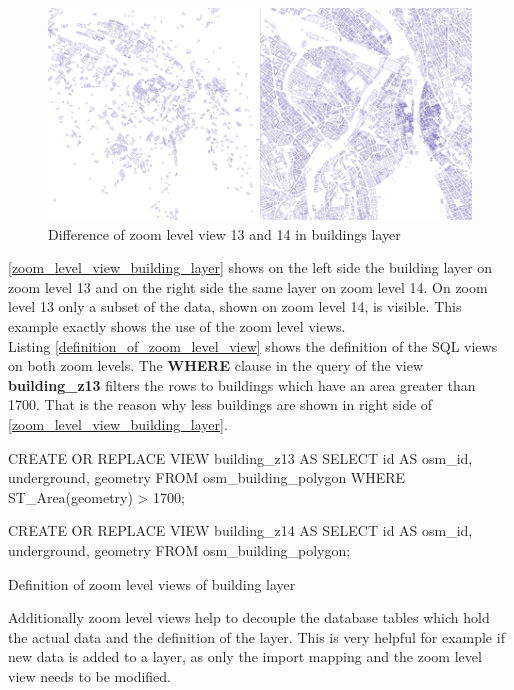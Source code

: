 \begin{figure}[H]
  \centering
  \includegraphics[width=\textwidth]{images/buildings_z13_z14}
  \caption{Difference of zoom level view 13 and 14 in buildings layer}
  \label{zoom_level_view_building_layer}
\end{figure}

\autoref{zoom_level_view_building_layer} shows on the left side the building layer on zoom level 13 and on the right side the same layer on zoom level 14. On zoom level 13 only a subset of the data, shown on zoom level 14, is visible. This example exactly shows the use of the zoom level views. 
\\
Listing \autoref{definition_of_zoom_level_view} shows the definition of the SQL views on both zoom levels. The \textbf{WHERE} clause in the query of the view \textbf{building\_z13} filters the rows to buildings which have an area greater than 1700. That is the reason why less buildings are shown in right side of \autoref{zoom_level_view_building_layer}.

\begin{listing}[H]
\begin{sqlcode}
CREATE OR REPLACE VIEW building_z13 AS
    SELECT id AS osm_id, underground, geometry
    FROM osm_building_polygon
    WHERE ST_Area(geometry) > 1700;

CREATE OR REPLACE VIEW building_z14 AS
    SELECT id AS osm_id, underground, geometry
    FROM osm_building_polygon;
\end{sqlcode}
\caption{Definition of zoom level views of building layer}
\label{definition_of_zoom_level_view}
\end{listing}

Additionally zoom level views help to decouple the database tables which hold the actual data and the definition of the layer. This is very helpful for example if new data is added to a layer, as only the import mapping and the zoom level view needs to be modified.

